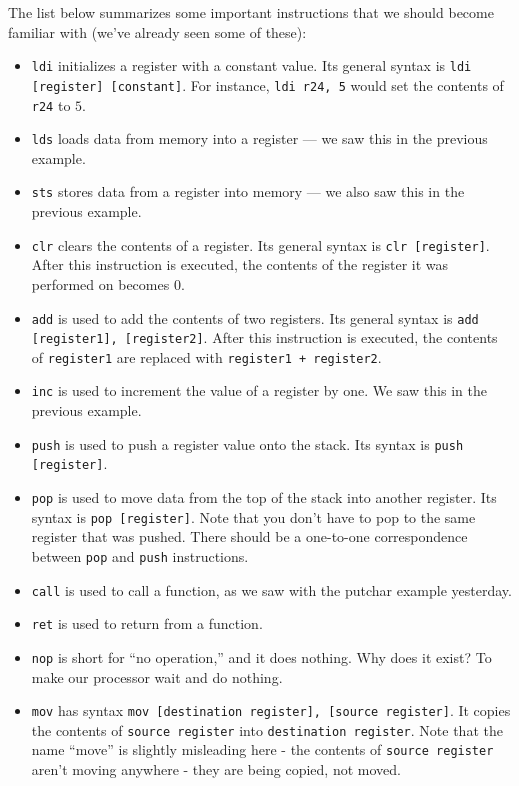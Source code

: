 The list below summarizes some important instructions that we should become familiar with (we've already seen some of these): \begin{itemize}
    \item \verb!ldi! initializes a register with a constant value. Its general syntax is \verb!ldi [register] [constant]!. For instance, \verb!ldi r24, 5! would set the contents of \verb!r24! to $5$. 
    \item \verb!lds! loads data from memory into a register --- we saw this in the previous example.
    \item \verb!sts! stores data from a register into memory --- we also saw this in the previous example.
    \item \verb!clr! clears the contents of a register. Its general syntax is \verb!clr [register]!. After this instruction is executed, the contents of the register it was performed on becomes $0$.
    \item \verb!add! is used to add the contents of two registers. Its general syntax is \verb!add [register1], [register2]!. After this instruction is executed, the contents of \verb!register1! are replaced with \verb!register1 + register2!. 
    \item \verb!inc! is used to increment the value of a register by one. We saw this in the previous example. 
    \item \verb!push! is used to push a register value onto the stack. Its syntax is \verb!push [register]!. 
    \item \verb!pop! is used to move data from the top of the stack into another register. Its syntax is \verb!pop [register]!. Note that you don't have to pop to the same register that was pushed. There should be a one-to-one correspondence between \verb!pop! and \verb!push! instructions.
    \item \verb!call! is used to call a function, as we saw with the putchar example yesterday.
    \item \verb!ret! is used to return from a function.
    \item \verb!nop! is short for ``no operation,'' and it does nothing. Why does it exist? To make our processor wait and do nothing.
    \item \verb!mov! has syntax \verb!mov [destination register], [source register]!. It copies the contents of \verb!source register! into \verb!destination register!. Note that the name ``move'' is slightly misleading here - the contents of \verb!source register! aren't moving anywhere - they are being copied, not moved.
\end{itemize}

